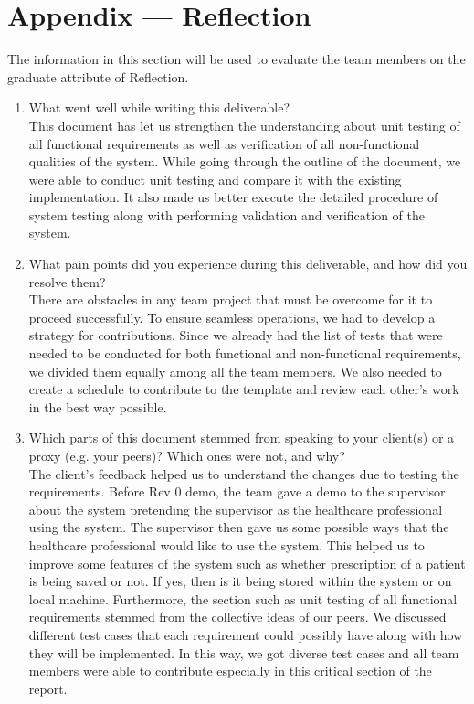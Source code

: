 \documentclass[12pt, titlepage]{article}
\begin{document}



\newpage{}
\section*{Appendix --- Reflection}

The information in this section will be used to evaluate the team members on the
graduate attribute of Reflection.



\begin{enumerate}
  \item What went well while writing this deliverable?\\
  This document has let us strengthen the understanding about unit testing of all functional requirements as well as verification of all non-functional qualities of the system. While going through the outline of the document, we were able to conduct unit testing and compare it with the existing implementation. It also made us better execute the detailed procedure of system testing along with performing validation and verification of the system. 

  \item What pain points did you experience during this deliverable, and how did you resolve them?\\
  There are obstacles in any team project that must be overcome for it to proceed successfully. To ensure seamless operations, we had to develop a strategy for contributions. Since we already had the list of tests that were needed to be conducted for both functional and non-functional requirements, we divided them equally among all the team members. We also needed to create a schedule to contribute to the template and review each other's work in the best way possible. 

  \item Which parts of this document stemmed from speaking to your client(s) or a proxy (e.g. your peers)? Which ones were not, and why?\\
  The client's feedback helped us to understand the changes due to testing the requirements. Before Rev 0 demo, the team gave a demo to the supervisor about the system pretending the supervisor as the healthcare professional using the system. The supervisor then gave us some possible ways that the healthcare professional would like to use the system. This helped us to improve some features of the system such as whether prescription of a patient is being saved or not. If yes, then is it being stored within the system or on local machine. Furthermore, the section such as unit testing of all functional requirements stemmed from the collective ideas of our peers. We discussed different test cases that each requirement could possibly have along with how they will be implemented. In this way, we got diverse test cases and all team members were able to contribute especially in this critical section of the report.


\end{enumerate}
\end{document}
